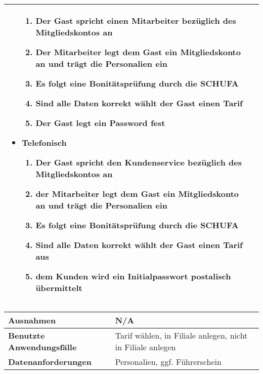 \begin{table}[H]
\begin{tabularx}{\textwidth}{|l|X|}
\begin{itemize}
            \begin{enumerate}
                \item Der Gast spricht einen Mitarbeiter bezüglich des Mitgliedskontos an
                \item Der Mitarbeiter legt dem Gast ein Mitgliedskonto an und trägt die Personalien ein
                \item Es folgt eine Bonitätsprüfung durch die SCHUFA
                \item Sind alle Daten korrekt wählt der Gast einen Tarif
                \item Der Gast legt ein Password fest
            \end{enumerate}
            \item Telefonisch
            \begin{enumerate}
                \item Der Gast spricht den Kundenservice bezüglich des Mitgliedskontos an
                \item der Mitarbeiter legt dem Gast ein Mitgliedskonto an und trägt die Personalien ein
                \item Es folgt eine Bonitätsprüfung durch die SCHUFA
                \item Sind alle Daten korrekt wählt der Gast einen Tarif aus
                \item dem Kunden wird ein Initialpasswort postalisch übermittelt
            \end{enumerate}
        \end{itemize}\\
        \bottomrule
    \end{tabularx}
\end{table}

\begin{tabularx}{\textwidth}{|l|X|}
\hline
\textbf{Ausnahmen}                & N/A                                \\
\hline
\textbf{Benutzte Anwendungsfälle} & Tarif wählen, in Filiale anlegen, nicht in Filiale anlegen           \\
\hline
\textbf{Datenanforderungen}       & Personalien, ggf. Führerschein \\
\bottomrule
\end{tabularx}